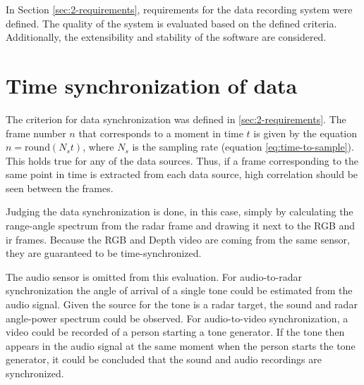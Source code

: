 In Section \ref{sec:2-requirements}, requirements for the data recording system were defined.
The quality of the system is evaluated based on the defined criteria.
Additionally, the extensibility and stability of the software are considered.

\section{Time synchronization of data}
The criterion for data synchronization was defined in \ref{sec:2-requirements}.
The frame number $n$ that corresponds to a moment in time $t$ is given by the equation $n = \mathrm{round}(N_{s} t)$,
where $N_{s}$ is the sampling rate (equation \ref{eq:time-to-sample}).
This holds true for any of the data sources.
Thus, if a frame corresponding to the same point in time is extracted from each data source,
high correlation should be seen between the frames.

Judging the data synchronization is done, in this case,
simply by calculating the range-angle spectrum from the radar frame and drawing it next to the RGB and \gls{ir} frames.
Because the RGB and Depth video are coming from the same sensor, they are guaranteed to be time-synchronized.

The audio sensor is omitted from this evaluation.
For audio-to-radar synchronization the angle of arrival of a single tone could be estimated from the audio signal.
Given the source for the tone is a radar target, the sound and radar angle-power spectrum could be observed.
For audio-to-video synchronization, a video could be recorded of a person starting a tone generator.
If the tone then appears in the audio signal at the same moment when the person starts the tone generator,
it could be concluded that the sound and audio recordings are synchronized.


